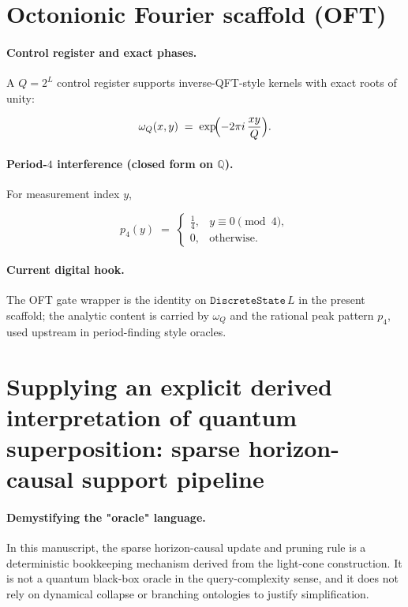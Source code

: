 \documentclass[11pt,a4paper]{article}
\theoremstyle{remark}
\begin{document}
\section{Octonionic Fourier scaffold (OFT)}

\paragraph{Control register and exact phases.}
A $Q=2^L$ control register supports inverse-QFT-style kernels with exact roots of unity:

\begin{equation}
  \omega_{Q}(x,y) \;=\; \exp\!\Bigl(-2\pi i\,\frac{xy}{Q}\Bigr).
\end{equation}

\paragraph{Period-$4$ interference (closed form on $\mathbb{Q}$).}
For measurement index $y$,

\begin{equation}
  p_4(y) \;=\;
  \begin{cases}
    \tfrac14, & y\equiv 0 \pmod 4,\\
    0, & \text{otherwise}.
  \end{cases}
\end{equation}

\paragraph{Current digital hook.}
The OFT gate wrapper is the identity on $\texttt{DiscreteState}\,L$ in the present scaffold; the analytic content is carried by $\omega_Q$ and the rational peak pattern $p_4$, used upstream in period-finding style oracles.

\section{Supplying an explicit derived interpretation of quantum superposition: sparse horizon-causal support pipeline}
\label{sec:sparse-pipeline}

\paragraph{Demystifying the "oracle" language.}
In this manuscript, the sparse horizon-causal update and pruning rule is a deterministic bookkeeping mechanism derived from the light-cone construction. It is not a quantum black-box oracle in the query-complexity sense, and it does not rely on dynamical collapse or branching ontologies to justify simplification.
\end{document}
